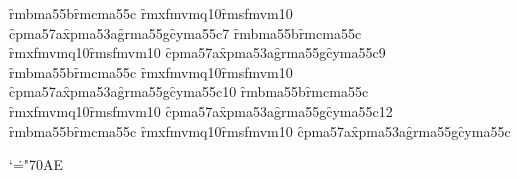 







	

\twosidedfalse	%
\newif\ifPS \PSfalse	%
\newif\iflong \longfalse %

\newfam\cpfam \newfam\xpfam \newfam\rmbfam \newfam\rmcfam \newfam\grfam
\newfam\rmxfam \newfam\rmsfam \newfam\cyfam
\def\extrafontsmap{\f{rmb}{ma55b}\f{rmc}{ma55c}%
    \@\f{rmx}{fmvmq10}\@\f{rms}{fmvm10}%
    \f{cp}{ma57a}\f{xp}{ma53a}\f{gr}{ma55g}\f{cy}{ma55c}}
\extrafontsmap{7}
\extrafontsmap{9}
\extrafontsmap{10}
\extrafontsmap{12}
\def\\{\macappend\BODYtemplate} \expandafter\\\expandafter{\extrafontsmap}
\bodyfonts

\def\footnotetextmark#1{{\rmb#1}}
\def\footnotenotemark#1{{\rmb#1}}
\def\TOCentrysubsubsec#1#2#3{}

\def\n#1{$ \textfont0=\font #1 $}	
\mathcode`\.="70AE		%
	
\def\idxunderline#1{\underline{#1}}  
\def\see#1#2{$ {\rmb \char1 } #1 $}

